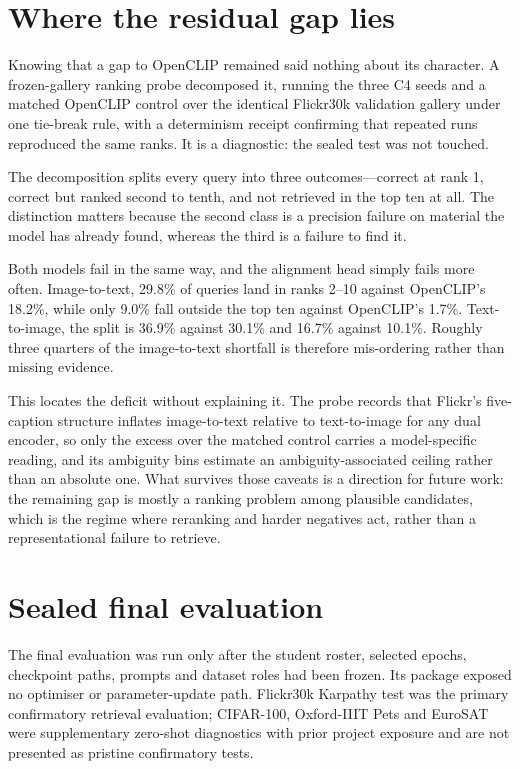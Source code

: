 \section{Where the residual gap lies}
Knowing that a gap to OpenCLIP remained said nothing about its character. A frozen-gallery ranking probe decomposed it, running the three C4 seeds and a matched OpenCLIP control over the identical Flickr30k validation gallery under one tie-break rule, with a determinism receipt confirming that repeated runs reproduced the same ranks. It is a diagnostic: the sealed test was not touched.

The decomposition splits every query into three outcomes---correct at rank 1, correct but ranked second to tenth, and not retrieved in the top ten at all. The distinction matters because the second class is a precision failure on material the model has already found, whereas the third is a failure to find it.

Both models fail in the same way, and the alignment head simply fails more often. Image-to-text, 29.8\% of queries land in ranks 2--10 against OpenCLIP's 18.2\%, while only 9.0\% fall outside the top ten against OpenCLIP's 1.7\%. Text-to-image, the split is 36.9\% against 30.1\% and 16.7\% against 10.1\%. Roughly three quarters of the image-to-text shortfall is therefore mis-ordering rather than missing evidence.

This locates the deficit without explaining it. The probe records that Flickr's five-caption structure inflates image-to-text relative to text-to-image for any dual encoder, so only the excess over the matched control carries a model-specific reading, and its ambiguity bins estimate an ambiguity-associated ceiling rather than an absolute one. What survives those caveats is a direction for future work: the remaining gap is mostly a ranking problem among plausible candidates, which is the regime where reranking and harder negatives act, rather than a representational failure to retrieve.

\section{Sealed final evaluation}
The final evaluation was run only after the student roster, selected epochs, checkpoint paths, prompts and dataset roles had been frozen. Its package exposed no optimiser or parameter-update path. Flickr30k Karpathy test was the primary confirmatory retrieval evaluation; CIFAR-100, Oxford-IIIT Pets and EuroSAT were supplementary zero-shot diagnostics with prior project exposure and are not presented as pristine confirmatory tests.

